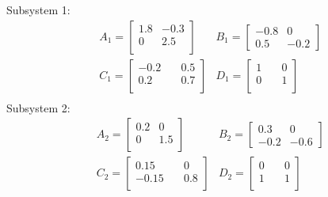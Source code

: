 \documentclass[twocolumn]{autart}    %
\begin{document}
\begin{exmp}
    Subsystem 1:
    \begin{equation}
        \begin{aligned}
            &A_{1} =  \begin{bmatrix}
                1.8 & -0.3\\
                0 & 2.5\\
            \end{bmatrix}
            &B_{1} =  \begin{bmatrix}
                -0.8 & 0\\
                0.5 & -0.2
            \end{bmatrix}\\
            &C_{1} =  \begin{bmatrix}
                -0.2 & \quad 0.5\\
                0.2 & \quad 0.7\\
            \end{bmatrix}
            &D_{1} =  \begin{bmatrix}
                1 & \quad 0\\
                0 & \quad 1\\
            \end{bmatrix}\\
        \end{aligned}
        \nonumber
    \end{equation}
    Subsystem 2:
    \begin{equation}
        \begin{aligned}
            &A_{2} =  \begin{bmatrix}
                0.2 & 0\\
                0 & 1.5\\
            \end{bmatrix}
            &B_{2} =  \begin{bmatrix}
                0.3 & 0\\
                -0.2 & -0.6
            \end{bmatrix}\\
            &C_{2} =  \begin{bmatrix}
                0.15 & \quad 0\\
                -0.15 & \quad 0.8\\
            \end{bmatrix}
            &D_{2} =  \begin{bmatrix}
                0 & \quad 0\\
                1 & \quad 1\\
            \end{bmatrix}\\
        \end{aligned}
        \nonumber
    \end{equation}
    

\end{exmp}
\end{document}
